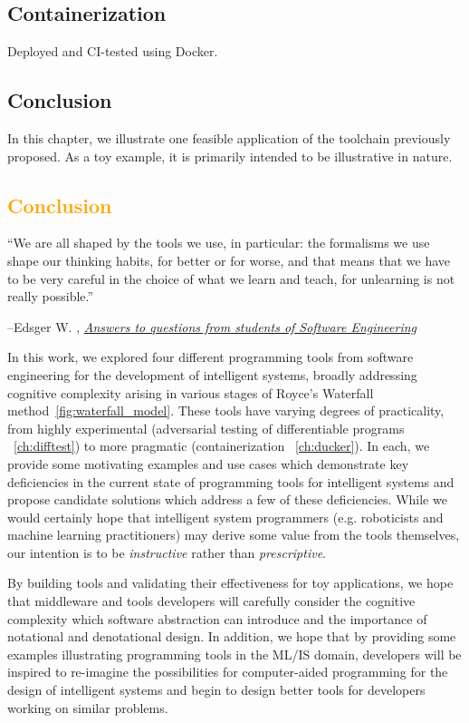 \documentclass[12pt,initial,twoside,maitrise]{dms}
\newcommand{\mediumrare}[1]{\textcolor{orange}{#1}}
\numberwithin{equation}{section}
\numberwithin{table}{chapter}
\numberwithin{figure}{chapter}
\begin{document}
\section{Containerization}

Deployed and CI-tested using Docker.

\section{Conclusion}

In this chapter, we illustrate one feasible application of the toolchain previously proposed. As a toy example, it is primarily intended to be illustrative in nature.

\mediumrare{\chapter{Conclusion}\label{ch:conclusion}}
\setlength{\epigraphwidth}{0.90\textwidth}
\epigraph{``We are all shaped by the tools we use, in particular: the formalisms we use shape our thinking habits, for better or for worse, and that means that we have to be very careful in the choice of what we learn and teach, for unlearning is not really possible.''}{\begin{flushright}--Edsger W. \citet{dijkstra2000answers}, \href{https://www.cs.utexas.edu/~EWD/transcriptions/EWD13xx/EWD1305.html}{\textit{Answers to questions from students of Software Engineering}}\end{flushright}}

In this work, we explored four different programming tools from software engineering for the development of intelligent systems, broadly addressing cognitive complexity arising in various stages of Royce's Waterfall method~\autoref{fig:waterfall_model}. These tools have varying degrees of practicality, from highly experimental (adversarial testing of differentiable programs ~\autoref{ch:difftest}) to more pragmatic (containerization ~\autoref{ch:ducker}). In each, we provide some motivating examples and use cases which demonstrate key deficiencies in the current state of programming tools for intelligent systems and propose candidate solutions which address a few of these deficiencies. While we would certainly hope that intelligent system programmers (e.g. roboticists and machine learning practitioners) may derive some value from the tools themselves, our intention is to be \textit{instructive} rather than \textit{prescriptive}.

By building tools and validating their effectiveness for toy applications, we hope that middleware and tools developers will carefully consider the cognitive complexity which software abstraction can introduce and the importance of notational and denotational design. In addition, we hope that by providing some examples illustrating programming tools in the ML/IS domain, developers will be inspired to re-imagine the possibilities for computer-aided programming for the design of intelligent systems and begin to design better tools for developers working on similar problems.
\end{document}
